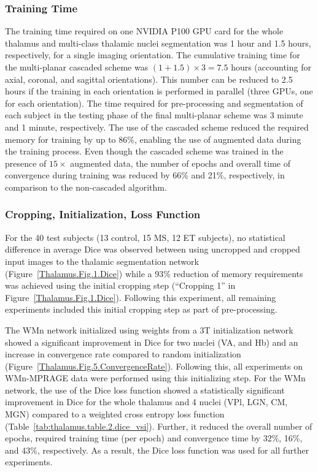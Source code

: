 \subsubsection{Training Time}
The training time required on one NVIDIA P100 GPU card for the whole thalamus and multi-class thalamic nuclei segmentation was 1 hour and 1.5 hours, respectively, for a single imaging orientation. The cumulative training time for the multi-planar cascaded scheme was $(1+1.5)\times3=7.5$ hours (accounting for axial, coronal, and sagittal orientations). This number can be reduced to 2.5 hours if the training in each orientation is performed in parallel (three GPUs, one for each orientation). The time required for pre-processing and segmentation of each subject in the testing phase of the final multi-planar scheme was 3 minute and 1 minute, respectively. The use of the cascaded scheme reduced the required memory for training by up to 86\%, enabling the use of augmented data during the training process. Even though the cascaded scheme was trained in the presence of $15\times $ augmented data, the number of epochs and overall time of convergence during training was reduced by 66\% and 21\%, respectively, in comparison to the non-cascaded algorithm.

\subsubsection{Cropping, Initialization, Loss Function}
For the 40 test subjects (13 control, 15 MS, 12 ET subjects), no statistical difference in average Dice was observed between using uncropped and cropped input images to the thalamic segmentation network (Figure~\ref{Thalamus.Fig.1.Dice}) while a 93\% reduction of memory requirements was achieved using the initial cropping step (``Cropping 1'' in Figure~\ref{Thalamus.Fig.1.Dice}). Following this experiment, all remaining experiments included this initial cropping step as part of pre-processing.

The WMn network initialized using weights from a 3T initialization network showed a significant improvement in Dice for two nuclei (VA, and Hb) and an increase in convergence rate compared to random initialization (Figure~\ref{Thalamus.Fig.5.ConvergenceRate}). Following this, all experiments on WMn-MPRAGE data were performed using this initializing step. For the WMn network, the use of the Dice loss function showed a statistically significant improvement in Dice for the whole thalamus and 4 nuclei (VPl, LGN, CM, MGN) compared to a weighted cross entropy loss function (Table~\ref{tab:thalamus.table.2.dice_vsi}). Further, it reduced the overall number of epochs, required training time (per epoch) and convergence time by 32\%, 16\%, and 43\%, respectively. As a result, the Dice loss function was used for all further experiments.

